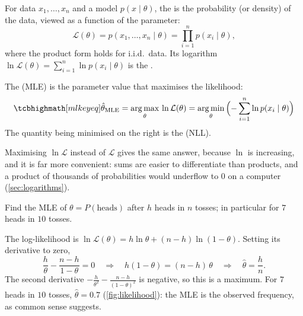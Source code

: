 \begin{definition}[Likelihood]\label{def:likelihood}
For data $x_1, \dots, x_n$ and a model $p(x \mid \theta)$, the
 is the probability (or density) of the data,
viewed as a function of the parameter:
\[
  \mathcal{L}(\theta) = p(x_1, \dots, x_n \mid \theta)
  = \prod_{i=1}^n p(x_i \mid \theta) ,
\]
where the product form holds for i.i.d.\ data. Its logarithm
$\ln\mathcal{L}(\theta) = \sum_{i=1}^n\ln p(x_i \mid \theta)$ is the
.
\end{definition}

\begin{definition}\label{def:mle}
The  (MLE) is
the parameter value that maximises the likelihood:
\[
  \keyeq{\hat\theta_{\mathrm{MLE}} = \argmax_\theta\,\ln\mathcal{L}(\theta)
  = \argmin_\theta\,\Bigl(-\sum_{i=1}^n\ln p(x_i \mid \theta)\Bigr)}
\]
The quantity being minimised on the right is the
 (NLL).
\end{definition}

Maximising $\ln\mathcal{L}$ instead of $\mathcal{L}$ gives the same answer,
because $\ln$ is increasing, and it is far more convenient: sums are easier to
differentiate than products, and a product of thousands of probabilities would
underflow to $0$ on a computer (\cref{sec:logarithms}).

\begin{example}\label{ex:mle-coin}
Find the MLE of $\theta = P(\text{heads})$ after $h$ heads in $n$ tosses; in
particular for $7$ heads in $10$ tosses.

\sol The log-likelihood is $\ln\mathcal{L}(\theta) = h\ln\theta + (n - h)\ln(1 -
\theta)$. Setting its derivative to zero,
\[
  \frac{h}{\theta} - \frac{n - h}{1 - \theta} = 0
  \quad\Longrightarrow\quad h(1 - \theta) = (n - h)\,\theta
  \quad\Longrightarrow\quad \hat\theta = \frac hn .
\]
The second derivative $-\frac{h}{\theta^2} - \frac{n-h}{(1-\theta)^2}$ is negative,
so this is a maximum. For $7$ heads in $10$ tosses, $\hat\theta = 0.7$
(\cref{fig:likelihood}): the MLE is the observed frequency, as common sense
suggests.
\end{example}

